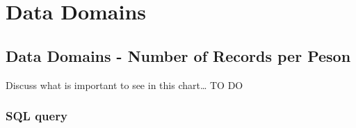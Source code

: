 \documentclass[]{book}
\begin{document}
\chapter{Data Domains}\label{data-domains}

\section{Data Domains - Number of Records per
Peson}\label{data-domains---number-of-records-per-peson}

Discuss what is important to see in this chart\ldots{} TO DO

\subsection{SQL query}\label{sql-query-18}
\end{document}
